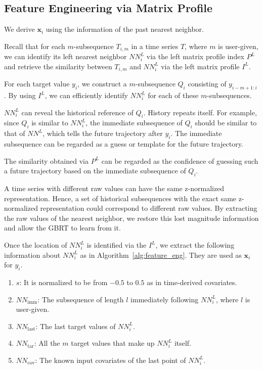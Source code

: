 \subsection{Feature Engineering via Matrix Profile} %

We derive $\bm{x}_i$ using the information of the past nearest neighbor.

Recall that for each $m$-subsequence $T_{i, m}$ in a time series $T$, where $m$ is user-given, we can identify its left nearest neighbor $NN^L_i$ via the left matrix profile index $P^L$ and retrieve the similarity between $T_{i, m}$ and $NN^L_i$ via the left matrix profile $I^L$.

For each target value $y_i$, we construct a $m$-subsequence $Q_i$ consisting of $y_{i-m+1:i}$. By using $I^L$, we can efficiently identify $NN^L_i$ for each of these $m$-subsequences.

$NN^L_i$ can reveal the historical reference of $Q_i$.
History repeats itself.
For example, since $Q_i$ is similar to $NN^L_i$, the immediate subsequence of $Q_i$ should be similar to that of $NN^L$, which tells the future trajectory after $y_i$. The immediate subsequence can be regarded as a guess or template for the future trajectory.

The similarity obtained via $P^L$ can be regarded as the confidence of guessing such a future trajectory based on the immediate subsequence of $Q_i$.

A time series with different raw values can have the same z-normalized representation.
Hence, a set of historical subsequences with the exact same z-normalized representation could correspond to different raw values.
By extracting the raw values of the nearest neighbor, we restore this lost magnitude information and allow the GBRT to learn from it.


Once the location of $NN^L_i$ is identified via the $I^L$, we extract the following information about $NN^L_i$ as in Algorithm~\ref{alg:feature_eng}. They are used as $\bm{x}_i$ for $y_i$.

\begin{enumerate}
    \item $s$: It is  normalized to be from $-0.5$ to $0.5$ as in time-derived covariates.
    \item $NN_{\text{imm}}$: The subsequence of length $l$ immediately following $NN^L_i$, where $l$ is user-given.
    \item $NN_{\text{last}}$: The last target values of $NN^L_i$.
    \item $NN_{\text{tar}}$: All the $m$ target values that make up $NN^L_i$ itself.
    \item $NN_{\text{cov}}$: The known input covariates of the last point of $NN^L_i$.
\end{enumerate}

